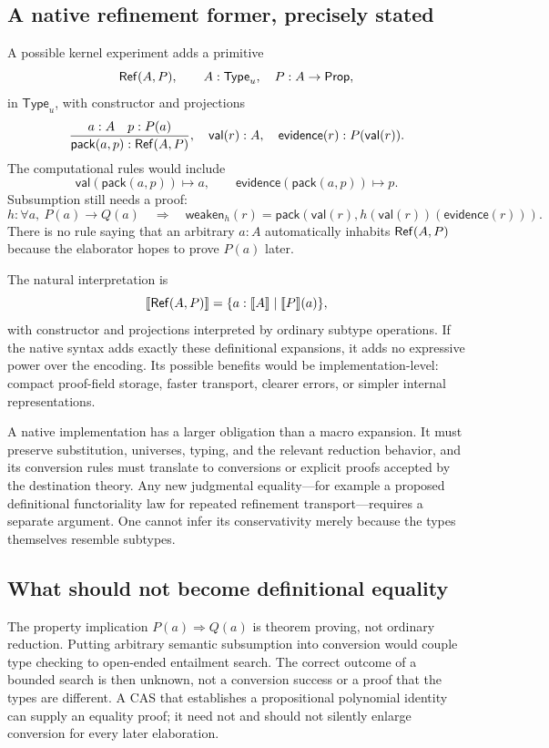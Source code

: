 \documentclass[11pt,a4paper]{article}
\newcommand{\Prop}{\ensuremath{\mathsf{Prop}}}\newcommand{\Req}{\mathsf{Req}}
\newcommand{\interpret}[1]{\llbracket #1\rrbracket}
\theoremstyle{definition}\newtheorem{definition}[theorem]{Definition}
\theoremstyle{remark}\newtheorem{remark}[theorem]{Remark}
\begin{document}
\subsection{A native refinement former, precisely stated}
A possible kernel experiment adds a primitive
\[
 \RefTy(A,P),\qquad A:\mathsf{Type}_u,\quad P:A\to\Prop,
\]
in $\mathsf{Type}_u$, with constructor and projections
\[
 \frac{a:A\quad p:P(a)}{\mathsf{pack}(a,p):\mathsf{Ref}(A,P)},
 \quad\mathsf{val}(r):A,
 \quad\mathsf{evidence}(r):P(\mathsf{val}(r)).
\]
The computational rules would include
\[
 \mathsf{val}(\mathsf{pack}(a,p))\longmapsto a,
 \qquad
 \mathsf{evidence}(\mathsf{pack}(a,p))\longmapsto p.
\]
Subsumption still needs a proof:
\[
 h:\forall a,\ P(a)\to Q(a)
 \quad\Longrightarrow\quad
 \mathsf{weaken}_h(r)=
 \mathsf{pack}(\mathsf{val}(r),h(\mathsf{val}(r))(\mathsf{evidence}(r))).
\]
There is no rule saying that an arbitrary $a:A$ automatically inhabits $\mathsf{Ref}(A,P)$ because the elaborator hopes to prove $P(a)$ later.

The natural interpretation is
\[
 \interpret{\RefTy(A,P)}=\{a:\interpret A\mid\interpret P(a)\},
\]
with constructor and projections interpreted by ordinary subtype operations. If the native syntax adds exactly these definitional expansions, it adds no expressive power over the encoding. Its possible benefits would be implementation-level: compact proof-field storage, faster transport, clearer errors, or simpler internal representations.

A native implementation has a larger obligation than a macro expansion. It must preserve substitution, universes, typing, and the relevant reduction behavior, and its conversion rules must translate to conversions or explicit proofs accepted by the destination theory. Any new judgmental equality---for example a proposed definitional functoriality law for repeated refinement transport---requires a separate argument. One cannot infer its conservativity merely because the types themselves resemble subtypes.

\subsection{What should not become definitional equality}
The property implication $P(a)\Rightarrow Q(a)$ is theorem proving, not ordinary reduction. Putting arbitrary semantic subsumption into conversion would couple type checking to open-ended entailment search. The correct outcome of a bounded search is then unknown, not a conversion success or a proof that the types are different. A CAS that establishes a propositional polynomial identity can supply an equality proof; it need not and should not silently enlarge conversion for every later elaboration.
\end{document}
